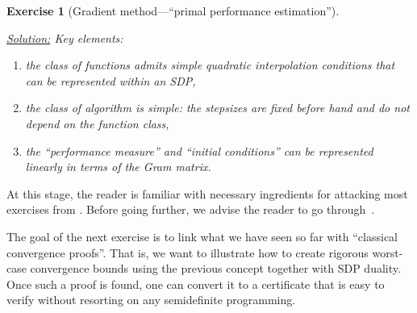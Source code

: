 \documentclass[11pt,a4paper]{article}
\newcommand{\correction}[1]{{{\color{blue}\underline{Solution:} #1}}}
\newcommand{\correction}[1]{}
\newtheorem{exercise}{Exercise}
\begin{document}
\begin{exercise}[Gradient method---``primal performance estimation'']
\begin{enumerate}
	\correction{ Key elements:
	\begin{enumerate}
	\item the class of functions admits simple quadratic interpolation conditions that can be represented within an SDP,
	\item the class of algorithm is simple: the stepsizes are fixed before hand and do not depend on the function class,
	\item the ``performance measure'' and ``initial conditions'' can be represented linearly in terms of the Gram matrix.
	\end{enumerate}
	
	}
	\end{enumerate}
	\end{exercise}

At this stage, the reader is familiar with necessary ingredients for attacking most exercises from . Before going further, we advise the reader to go through~. 

The goal of the next exercise is to link what we have seen so far with ``classical convergence proofs''. That is, we want to illustrate how to create rigorous worst-case convergence bounds using the previous concept together with SDP duality. Once such a proof is found, one can convert it to a certificate that is easy to verify without resorting on any semidefinite programming.
\end{document}
